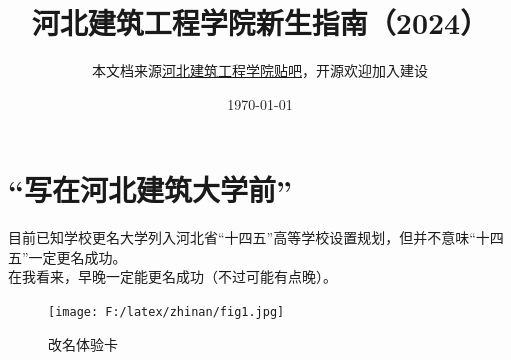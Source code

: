 \documentclass[12pt]{article} %
\title{河北建筑工程学院新生指南（2024）}
\author{本文档来源\href{https://tieba.baidu.com/p/9062077312?pn=1}{河北建筑工程学院贴吧}，开源欢迎加入建设}
\date{\today} %
\begin{document}
	
	\maketitle %
	\thispagestyle{empty} %
	
	\tableofcontents %
	\clearpage
	
	\pagestyle{fancy}
	\fancyhf{} %
	\cfoot{} %
\rfoot{\color{color2}\thepage} 
	
\section{“写在河北建筑大学前”}
	

目前已知学校更名大学列入河北省“十四五”高等学校设置规划，但并不意味“十四五”一定更名成功。\\

在我看来，早晚一定能更名成功（不过可能有点晚）。\\

	\begin{figure}[!h]
	\centering
	\texttt{[image: F:/latex/zhinan/fig1.jpg]}
	\caption{改名体验卡} %
	\end{figure}
	
	\newpage
	
	
	
	
	
	
\end{document}
